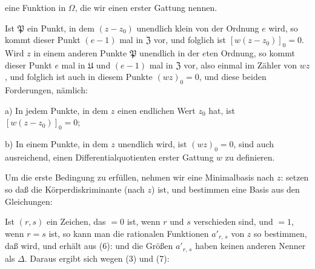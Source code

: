 
eine Funktion in $\Omega$, die wir einen 
erster Gattung nennen.

Ist $\mathfrak{P}$ ein Punkt, in dem $(z - z_0)$ unendlich klein von der
Ordnung $e$ wird, so kommt dieser Punkt $(e - 1)$ mal in $\mathfrak{Z}$ vor,
und folglich ist $[w(z - z_0)]_0 = 0$. Wird $z$ in einem anderen
Punkte $\mathfrak{P}$ unendlich in der $e$ten Ordnung, so kommt dieser
Punkt $e$ mal in $\mathfrak{U}$ und $(e - 1)$ mal in $\mathfrak{Z}$ vor, also einmal im
Zähler von $wz$, und folglich ist auch in diesem Punkte $(wz)_0 = 0$,
und diese beiden Forderungen, nämlich:

a) In jedem Punkte, in dem $z$ einen endlichen Wert $z_0$ hat,
ist $[w(z - z_0)]_0 = 0$;

b) In einem Punkte, in dem $z$ unendlich wird, ist $(wz)_0 = 0$,
sind auch ausreichend, einen Differentialquotienten erster Gattung
$w$ zu definieren.

Um die erste Bedingung zu erfüllen, nehmen wir eine
Minimalbasis nach $z$:
setzen
so daß
die Körperdiskriminante (nach $z$) ist, und bestimmen eine Basis
aus den Gleichungen:

Ist $(r, s)$ ein Zeichen, das $= 0$ ist, wenn $r$ und $s$ verschieden
sind, und $= 1$, wenn $r = s$ ist, so kann man die rationalen
Funktionen $a'_{r,\,s}$ von $z$ so bestimmen, daß
wird, und erhält aus (6):
und die Größen $a'_{r,\,s}$ haben keinen anderen Nenner als $\Delta$.
Daraus ergibt sich wegen (3) und (7):
